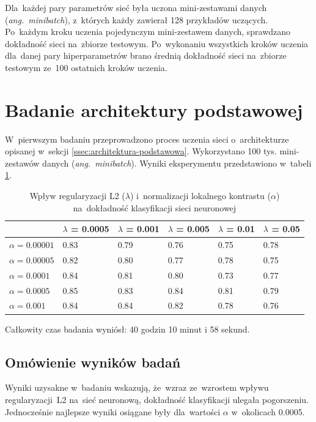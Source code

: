 Dla~każdej pary parametrów sieć była uczona mini-zestawami danych (\textit{ang.~minibatch}), z~których
każdy zawierał 128 przykładów uczących. Po~każdym kroku uczenia pojedynczym mini-zestawem danych, sprawdzano
dokładność sieci na~zbiorze testowym. Po~wykonaniu wszystkich kroków uczenia dla~danej pary hiperparametrów
brano średnią dokładność sieci na~zbiorze testowym ze~100 ostatnich kroków uczenia.

\section{Badanie architektury podstawowej} \label{sec:badanie-1}
W~pierwszym badaniu przeprowadzono proces uczenia sieci o~architekturze opisanej w~sekcji
\ref{ssec:architektura-podstawowa}. Wykorzystano 100 tys. mini-zestawów danych (\textit{ang.~minibatch}).
Wyniki eksperymentu przedstawiono w~tabeli \ref{table:wyniki1}.

\begin{table}[H]
    \centering
    \begin{tabular}{|l|l|l|l|l|l|}
      \hline
                       & $\lambda$ = 0.0005 & $\lambda$ = 0.001 & $\lambda$ = 0.005 & $\lambda$ = 0.01 & $\lambda$ = 0.05 \\
      \hline
      $\alpha=0.00001$ & 0.83 & 0.79 & 0.76 & 0.75 & 0.78 \\
      \hline
      $\alpha=0.00005$ & 0.82 & 0.80 & 0.77 & 0.78 & 0.75 \\
      \hline
      $\alpha=0.0001$  & 0.84 & 0.81 & 0.80 & 0.73 & 0.77 \\
      \hline
      $\alpha=0.0005$  & 0.85 & 0.83 & 0.84 & 0.81 & 0.79 \\
      \hline
      $\alpha=0.001$   & 0.84 & 0.84 & 0.82 & 0.78 & 0.76 \\
      \hline
    \end{tabular}
    \caption{Wpływ regularyzacji L2 ($\lambda$) i~normalizacji lokalnego kontrastu ($\alpha$) na~dokładność klasyfikacji
    sieci neuronowej}
    \label{table:wyniki1}
\end{table}

Całkowity czas badania wyniósł: 40 godzin 10 minut i 58 sekund.

\subsection{Omówienie wyników badań}
Wyniki uzysakne w~badaniu wskazują, że~wzraz ze~wzrostem wpływu regularyzacji~L2 na~sieć neuronową, dokładność
klasyfikacji ulegała pogorszeniu. Jednocześnie najlepsze wyniki osiągane były dla~wartości $\alpha$ w~okolicach 0.0005.

